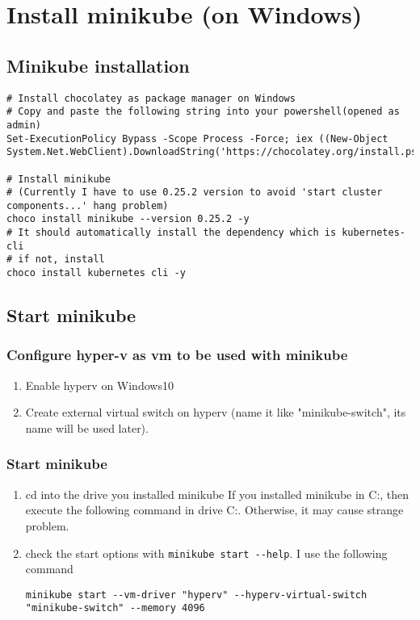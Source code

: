 \documentclass[11pt]{article}
\date{\today}
\title{}
\begin{document}
\tableofcontents

\section{Install minikube (on Windows)}
\label{sec:org54f2c5a}
\subsection{Minikube installation}
\label{sec:orgabb6c25}
\begin{verbatim}
# Install chocolatey as package manager on Windows
# Copy and paste the following string into your powershell(opened as admin)
Set-ExecutionPolicy Bypass -Scope Process -Force; iex ((New-Object System.Net.WebClient).DownloadString('https://chocolatey.org/install.ps1'))

# Install minikube
# (Currently I have to use 0.25.2 version to avoid 'start cluster components...' hang problem)
choco install minikube --version 0.25.2 -y
# It should automatically install the dependency which is kubernetes-cli
# if not, install
choco install kubernetes cli -y

\end{verbatim}
\subsection{Start minikube}
\label{sec:orga3ce7d9}
\subsubsection{Configure hyper-v as vm to be used with minikube}
\label{sec:orge07998f}
\begin{enumerate}
\item Enable hyperv on Windows10
\item Create external virtual switch on hyperv (name it like "minikube-switch", its name will be used later).
\end{enumerate}
\subsubsection{Start minikube}
\label{sec:org697eeaf}
\begin{enumerate}
\item cd into the drive you installed minikube
If you installed minikube in C:, then execute the following command in drive C:. Otherwise, it may cause strange problem.
\item check the start options with \texttt{minikube start -{}-help}. I use the following command
\begin{verbatim}
minikube start --vm-driver "hyperv" --hyperv-virtual-switch "minikube-switch" --memory 4096
\end{verbatim}
\end{enumerate}
\end{document}
